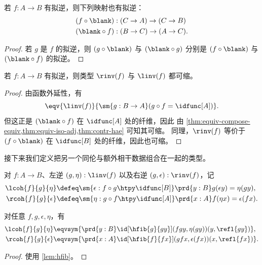\begin{lem}\label{thm:equiv-compose-equiv}
  若 $f:A\to B$ 有拟逆，则下列映射也有拟逆：
  \begin{align*}
    (f\circ \blank) &: (C\to A) \to (C\to B)\\
    (\blank\circ f) &: (B\to C) \to (A\to C).
  \end{align*}
\end{lem}
\begin{proof}
  若 $g$ 是 $f$ 的拟逆，则 $(g\circ \blank)$ 与 $(\blank\circ g)$ 分别是 $(f\circ \blank)$ 与 $(\blank\circ f)$ 的拟逆。
\end{proof}

\begin{lem}\label{lem:inv-hprop}
  若 $f : A \to B$ 有拟逆，则类型 $\rinv(f)$ 与 $\linv(f)$ 都可缩。
\end{lem}
\begin{proof}
  由函数外延性，有
  \[\eqv{\linv(f)}{\sm{g:B\to A} (g\circ f = \idfunc[A])}.\]
  但这正是 $(\blank\circ f)$ 在 $\idfunc[A]$ 处的纤维，因此
  由 \cref{thm:equiv-compose-equiv,thm:equiv-iso-adj,thm:contr-hae} 可知其可缩。
  同理，$\rinv(f)$ 等价于 $(f\circ \blank)$ 在 $\idfunc[B]$ 处的纤维，因此也可缩。
\end{proof}

接下来我们定义把另一个同伦与额外相干数据组合在一起的类型。%

\begin{defn}\label{defn:lcoh-rcoh}
对 $f : A \to B$、左逆 $(g,\eta) : \linv(f)$ 以及右逆 $(g,\epsilon) : \rinv(f)$，记
\begin{align*}
\lcoh{f}{g}{\eta} & \defeq \sm{\epsilon : f\circ g \htpy \idfunc[B]} \prd{y:B} g(\epsilon y) = \eta (gy), \\
\rcoh{f}{g}{\epsilon} & \defeq \sm{\eta : g\circ f \htpy \idfunc[A]} \prd{x:A} f(\eta x) = \epsilon (fx).
\end{align*}
\end{defn}

\begin{lem}\label{lem:coh-hfib}
对任意 $f,g,\epsilon,\eta$，有
\begin{align*}
\lcoh{f}{g}{\eta} & \eqvsym {\prd{y:B} \id[\hfib{g}{gy}]{(fgy,\eta(gy))}{(y,\refl{gy})}}, \\
\rcoh{f}{g}{\epsilon} & \eqvsym {\prd{x:A} \id[\hfib{f}{fx}]{(gfx,\epsilon(fx))}{(x,\refl{fx})}}.
\end{align*}
\end{lem}
\begin{proof}
使用 \cref{lem:hfib}。
\end{proof}

